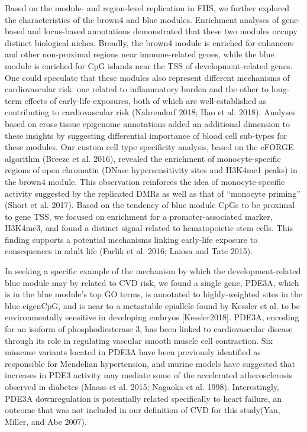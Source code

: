 \documentclass[]{article}
\theoremstyle{definition}
\theoremstyle{definition}
\theoremstyle{definition}
\theoremstyle{remark}
\begin{document}
Based on the module- and region-level replication in FHS, we further
explored the characteristics of the brown4 and blue modules. Enrichment
analyses of gene-based and locus-based annotations demonstrated that
these two modules occupy distinct biological niches. Broadly, the brown4
module is enriched for enhancers and other non-proximal regions near
immune-related genes, while the blue module is enriched for CpG islands
near the TSS of development-related genes. One could speculate that
these modules also represent different mechanisms of cardiovascular
risk: one related to inflammatory burden and the other to long-term
effects of early-life exposures, both of which are well-established as
contributing to cardiovascular risk (Nahrendorf 2018; Hao et al. 2018).
Analyses based on cross-tissue epigenome annotations added an additional
dimension to these insights by suggesting differential importance of
blood cell sub-types for these modules. Our custom cell type specificity
analysis, based on the eFORGE algorithm (Breeze et al. 2016), revealed
the enrichment of monocyte-specific regions of open chromatin (DNase
hypersensitivity sites and H3K4me1 peaks) in the brown4 module. This
observation reinforces the idea of monocyte-specific activity suggested
by the replicated DMRs as well as that of ``monocyte priming'' (Short et
al. 2017). Based on the tendency of blue module CpGs to be proximal to
gene TSS, we focused on enrichment for a promoter-associated marker,
H3K4me3, and found a distinct signal related to hematopoietic stem
cells. This finding supports a potential mechanisms linking early-life
exposure to consequences in adult life (Farlik et al. 2016; Laiosa and
Tate 2015).

In seeking a specific example of the mechanism by which the
development-related blue module may by related to CVD risk, we found a
single gene, PDE3A, which is in the blue module's top GO terms, is
annotated to highly-weighted sites in the blue eigenCpG, and is near to
a metastable epiallele found by Kessler et al. to be environmentally
sensitive in developing embryos {[}Kessler2018{]}. PDE3A, encoding for
an isoform of phosphodiesterase 3, has been linked to cardiovascular
disease through its role in regulating vascular smooth muscle cell
contraction. Six missense variants located in PDE3A have been previously
identified as responsible for Mendelian hypertension, and murine models
have suggested that increases in PDE3 activity may mediate some of the
accelerated atherosclerosis observed in diabetes (Maass et al. 2015;
Nagaoka et al. 1998). Interestingly, PDE3A downregulation is potentially
related specifically to heart failure, an outcome that was not included
in our definition of CVD for this study(Yan, Miller, and Abe 2007).
\end{document}
